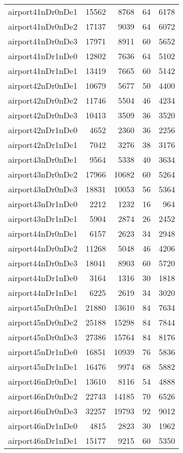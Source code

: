\begin{longtable}{lrrrr}
airport41nDr0nDe1 & 15562 & 8768 & 64 & 6178 \\
airport41nDr0nDe2 & 17137 & 9039 & 64 & 6072 \\
airport41nDr0nDe3 & 17971 & 8911 & 60 & 5652 \\
airport41nDr1nDe0 & 12802 & 7636 & 64 & 5102 \\
airport41nDr1nDe1 & 13419 & 7665 & 60 & 5142 \\
airport42nDr0nDe1 & 10679 & 5677 & 50 & 4400 \\
airport42nDr0nDe2 & 11746 & 5504 & 46 & 4234 \\
airport42nDr0nDe3 & 10413 & 3509 & 36 & 3520 \\
airport42nDr1nDe0 & 4652 & 2360 & 36 & 2256 \\
airport42nDr1nDe1 & 7042 & 3276 & 38 & 3176 \\
airport43nDr0nDe1 & 9564 & 5338 & 40 & 3634 \\
airport43nDr0nDe2 & 17966 & 10682 & 60 & 5264 \\
airport43nDr0nDe3 & 18831 & 10053 & 56 & 5364 \\
airport43nDr1nDe0 & 2212 & 1232 & 16 & 964 \\
airport43nDr1nDe1 & 5904 & 2874 & 26 & 2452 \\
airport44nDr0nDe1 & 6157 & 2623 & 34 & 2948 \\
airport44nDr0nDe2 & 11268 & 5048 & 46 & 4206 \\
airport44nDr0nDe3 & 18041 & 8903 & 60 & 5720 \\
airport44nDr1nDe0 & 3164 & 1316 & 30 & 1818 \\
airport44nDr1nDe1 & 6225 & 2619 & 34 & 3020 \\
airport45nDr0nDe1 & 21880 & 13610 & 84 & 7634 \\
airport45nDr0nDe2 & 25188 & 15298 & 84 & 7844 \\
airport45nDr0nDe3 & 27386 & 15764 & 84 & 8176 \\
airport45nDr1nDe0 & 16851 & 10939 & 76 & 5836 \\
airport45nDr1nDe1 & 16476 & 9974 & 68 & 5882 \\
airport46nDr0nDe1 & 13610 & 8116 & 54 & 4888 \\
airport46nDr0nDe2 & 22743 & 14185 & 70 & 6526 \\
airport46nDr0nDe3 & 32257 & 19793 & 92 & 9012 \\
airport46nDr1nDe0 & 4815 & 2823 & 30 & 1962 \\
airport46nDr1nDe1 & 15177 & 9215 & 60 & 5350 \\

\end{longtable}
